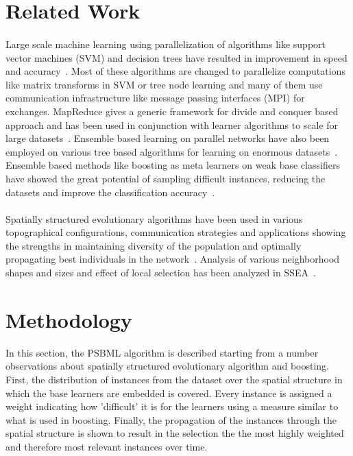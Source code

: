 \documentclass{llncs}
\begin{document}
\section{Related Work}
\paragraph{}
Large scale machine learning using parallelization of algorithms like support vector machines (SVM) and decision trees have resulted in improvement in speed and accuracy~\cite{psvm}. Most of these algorithms are changed to parallelize computations like matrix transforms in SVM or tree node learning and many of them use communication infrastructure like message passing interfaces (MPI) for exchanges. MapReduce gives a generic framework for divide and conquer based approach and has been used in conjunction with learner algorithms to scale for large datasets~\cite{NIPS2006725}. Ensemble based learning on parallel networks have also been employed on various tree based algorithms for learning on enormous datasets~\cite{treeensembles,tree2}. Ensemble based methods like boosting as meta learners on weak base classifiers have showed the great potential of sampling difficult instances, reducing the datasets and improve the classification accuracy~\cite{Schapire97boosting}.
\paragraph{}
Spatially structured evolutionary algorithms have been used in various topographical configurations, communication strategies and applications showing the strengths in maintaining diversity of the population and optimally propagating best individuals in the network~\cite{tomassini2005spatially}. Analysis of various neighborhood shapes and sizes and effect of local selection has been analyzed in SSEA~\cite{Sarma96ananalysis}.

\section{Methodology}
In this section, the PSBML algorithm is described starting from a number observations about spatially structured evolutionary algorithm and boosting. First, the distribution of instances from the dataset over the spatial structure in which the base learners are embedded is covered. Every instance is assigned a weight indicating how 'difficult' it is for the learners using a measure similar to what is used in boosting. Finally, the propagation of the instances through the spatial structure is shown to result in the selection the the most highly weighted and therefore most relevant instances over time.
\end{document}
